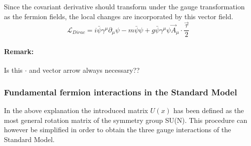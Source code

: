 Since the covariant derivative should transform under the gauge transformation as the fermion fields, the local changes are incorporated by this vector field.
\begin{equation} \label{eq::DiracLInter}
 \mathcal{L}_{Dirac} = i \bar{\psi} \gamma^{\mu} \partial_{\mu} \psi - m \bar{\psi} \psi + g \bar{\psi} \gamma^{\mu} \psi \vec{A}_{\mu} \cdot \frac{\vec{\tau}}{2}
\end{equation}
\paragraph{Remark: } Is this $\cdot$ and vector arrow always necessary??

\subsubsection{Fundamental fermion interactions in the Standard Model}
In the above explanation the introduced matrix $U(x)$ has been defined as the most general rotation matrix of the symmetry group SU(N).
This procedure can however be simplified in order to obtain the three gauge interactions of the Standard Model. %

